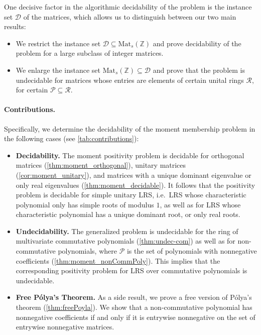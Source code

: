 \documentclass[11pt]{article}
\theoremstyle{definition}
\begin{document}
One decisive factor in the algorithmic decidability of the problem is the instance set $\mathcal{D}$ of the matrices, which allows us to distinguish between our two main results: 
\begin{itemize}
	\item We restrict the instance set $\mathcal{D} \subseteq \mathrm{Mat}_s(\mathbb{Z})$ and prove decidability of the problem for a large subclass of integer matrices.
	\item We enlarge the instance set $\mathrm{Mat}_s(\mathbb{Z}) \subseteq \mathcal{D}$ and prove that the problem is undecidable 
for	matrices whose entries are elements of certain unital rings $\mathcal{R},$ for certain $\mathcal{P} \subseteq \mathcal{R}$.
\end{itemize}

\paragraph{Contributions.} Specifically, we determine the decidability of the moment membership problem in the following cases (see \cref{tab:contributions}):
\begin{itemize}
	\item \textbf{Decidability.} The moment positivity problem is decidable for orthogonal matrices (\cref{thm:moment_orthogonal}),  unitary matrices (\cref{cor:moment_unitary}), and matrices with a unique dominant eigenvalue or only real eigenvalues (\cref{thm:moment_decidable}).
	It follows that the positivity problem is decidable for simple unitary LRS, i.e.\ LRS whose characteristic polynomial only has simple  roots of modulus $1$,  
	as well as for LRS whose characteristic polynomial has a unique dominant root, or only real roots. 
	\item \textbf{Undecidability.} The generalized problem is undecidable for the ring of multivariate commutative polynomials (\cref{thm:undec-com}) as well as for non-commutative polynomials, where $\mathcal P$ is the set of polynomials with nonnegative coefficients (\cref{thm:moment_nonCommPoly}). 
	This implies that the corresponding positivity problem for LRS over commutative polynomials is undecidable.
	\item \textbf{Free P\'olya's Theorem.} As a side result, we prove a free version of P\'olya's theorem (\cref{thm:freePoyla}). We show that a non-commutative polynomial has nonnegative coefficients if and only if it is entrywise nonnegative on the set of entrywise nonnegative matrices.  
\end{itemize}
\end{document}
